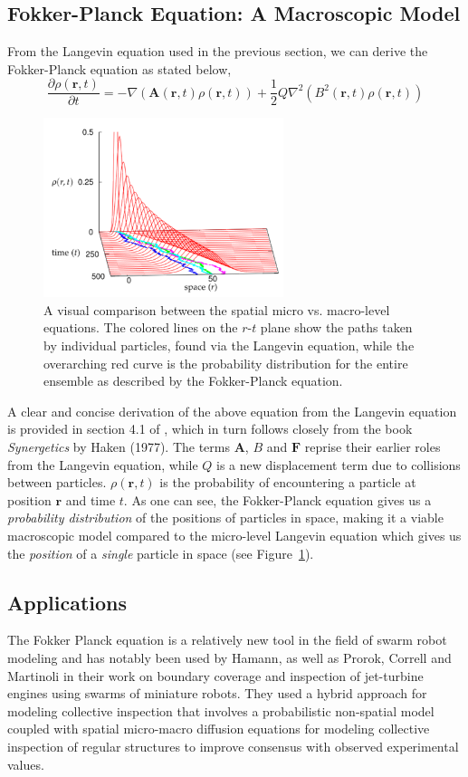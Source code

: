 \documentclass[11pt, onecolumn, compsoc, letterpaper]{article}
\newcommand{\PD}[2][t]{\frac{\partial #2}{\partial #1}}
\newcommand{\V}[1]{\mathbf{#1}}
\begin{document}
\subsection{Fokker-Planck Equation: A Macroscopic Model}
From the Langevin equation used in the previous section, we can derive the Fokker-Planck equation as stated below,
\begin{equation}
\PD{\rho(\V{r},t)} = -\nabla(\V{A}(\V{r},t)\rho(\V{r},t))+\frac{1}{2}Q\nabla^2(B^2(\V{r},t)\rho(\V{r},t))
\end{equation}
\begin{figure}[!ht]
\centering\includegraphics[width=7cm]{../assets/fokkerPlanck.png}
\centering\caption{A visual comparison between the spatial micro vs. macro-level equations. The colored lines on the $r$-$t$ plane show the paths taken by individual particles, found via the Langevin equation, while the overarching red curve is the probability distribution for the entire ensemble as described by the Fokker-Planck equation.}\label{fig:fokkerplanck}
\end{figure}

A clear and concise derivation of the above equation from the Langevin equation is provided in section 4.1 of \cite{Hamann2010}, which in turn follows closely from the book \emph{Synergetics} by Haken (1977). The terms $\V{A}$, $B$ and $\V{F}$ reprise their earlier roles from the Langevin equation, while $Q$ is a new displacement term due to collisions between particles. $\rho(\V{r}, t)$ is the probability of encountering a particle at position $\V{r}$ and time $t$. As one can see, the Fokker-Planck equation gives us a \emph{probability distribution} of the positions of particles in space, making it a viable macroscopic model compared to the micro-level Langevin equation which gives us the \emph{position} of a \emph{single} particle in space (see Figure~\ref{fig:fokkerplanck}).

\subsection{Applications}
The Fokker Planck equation is a relatively new tool in the field of swarm robot modeling and has notably been used by Hamann\cite{Hamann2008,Hamann2010}, as well as Prorok, Correll and Martinoli\cite{Prorok2011} in their work on boundary coverage and inspection of jet-turbine engines using swarms of miniature robots. They used a hybrid approach for modeling collective inspection that involves a probabilistic non-spatial model coupled with spatial micro-macro diffusion equations for modeling collective inspection of regular structures to improve consensus with observed experimental values. 
\end{document}
